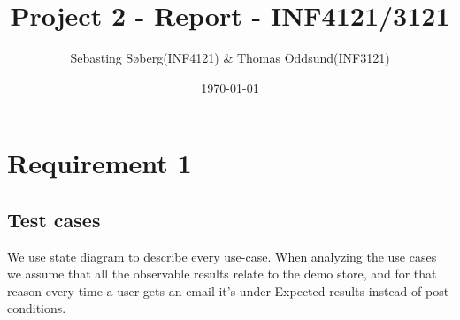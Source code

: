 \documentclass[UKenglish,12pt]{article}
\title{Project 2 - Report - INF4121/3121} %
\date{\today} %
\author{Sebasting Søberg(INF4121) \& Thomas Oddsund(INF3121)}
\begin{document}
\maketitle %

\section{Requirement 1}
\subsection{Test cases}
We use state diagram to describe every use-case. When analyzing the use cases we assume that all the observable results relate to the demo store, and for that reason every time a user gets an email it's under Expected results instead of post-conditions.
\end{document}
